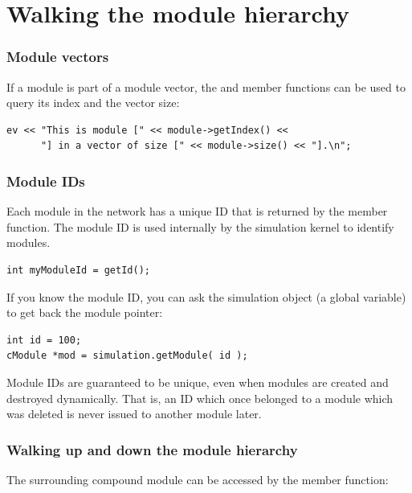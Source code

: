 \section{Walking the module hierarchy}
\label{sec:simple-modules:walking-module-hierarchy}

\subsubsection{Module vectors}


If a module is part of a module vector, the
 and  member functions can be used to
query its index and the vector size:

\begin{verbatim}
ev << "This is module [" << module->getIndex() <<
      "] in a vector of size [" << module->size() << "].\n";
\end{verbatim}


\subsubsection{Module IDs}


Each module in the network has a unique ID that is returned by the
 member function. The module ID is used
internally by the simulation kernel to identify modules.

\begin{verbatim}
int myModuleId = getId();
\end{verbatim}

If you know the module ID, you can ask the simulation object
(a global variable) to get back the module pointer:

\begin{verbatim}
int id = 100;
cModule *mod = simulation.getModule( id );
\end{verbatim}


Module IDs are guaranteed to be unique, even when modules are
created and destroyed dynamically. That is, an ID which once
belonged to a module which was deleted is never issued to another
module later.


\subsubsection{Walking up and down the module hierarchy}


The surrounding compound module can be accessed by the
 member function:

